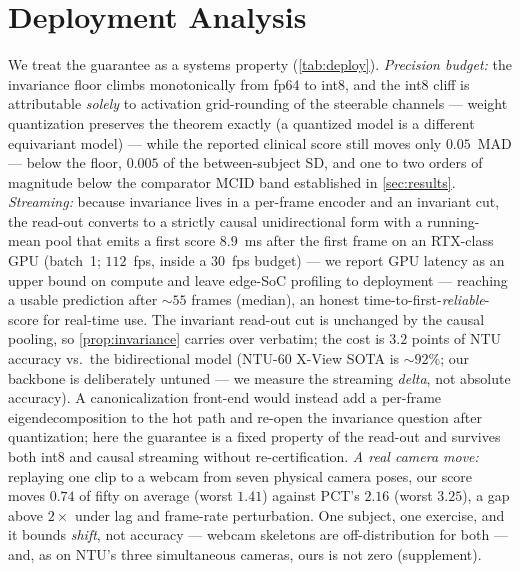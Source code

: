 \documentclass[10pt,twocolumn,letterpaper]{article}
\begin{document}
\section{Deployment Analysis}\label{sec:edge}
We treat the guarantee as a systems property (\cref{tab:deploy}). \emph{Precision budget:} the
invariance floor climbs monotonically from fp64 to int8, and the int8 cliff is attributable
\emph{solely} to activation grid-rounding of the steerable channels --- weight quantization preserves
the theorem exactly (a quantized model is a different equivariant model) --- while the reported clinical
score still moves only $0.05$~MAD --- below the floor, $0.005$ of the between-subject SD, and one to two
orders of magnitude below the comparator MCID band established in \cref{sec:results}. \emph{Streaming:} because invariance lives in a
per-frame encoder and an invariant cut, the read-out converts to a strictly causal unidirectional form
with a running-mean pool that emits a first score $8.9$~ms after the first frame on an RTX-class GPU
(batch~1; $112$~fps, inside a $30$~fps budget) --- we report GPU latency as an upper bound on compute
and leave edge-SoC profiling to deployment --- reaching a usable prediction after $\sim\!55$ frames
(median), an honest time-to-first-\emph{reliable}-score for real-time use. The invariant read-out cut
is unchanged by the causal pooling, so \cref{prop:invariance} carries over verbatim; the cost is
$3.2$ points of NTU accuracy vs.\ the bidirectional model (NTU-60 X-View SOTA is $\sim\!92\%$; our
backbone is deliberately untuned --- we measure the streaming \emph{delta}, not absolute accuracy). A
canonicalization front-end would instead add a per-frame eigendecomposition to the hot path and
re-open the invariance question after quantization; here the guarantee is a fixed property of the
read-out and survives both int8 and causal streaming without re-certification. \emph{A real camera
move:} replaying one clip to a webcam from seven physical camera poses, our score moves $0.74$ of
fifty on average (worst $1.41$) against PCT's $2.16$ (worst $3.25$), a gap above $2\times$ under lag
and frame-rate perturbation. One subject, one exercise, and it bounds \emph{shift}, not accuracy ---
webcam skeletons are off-distribution for both --- and, as on NTU's three simultaneous cameras, ours
is not zero (supplement).
\end{document}
